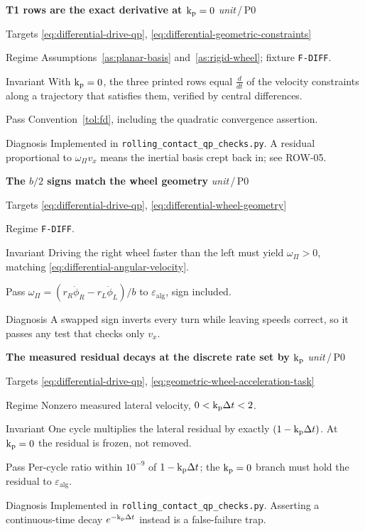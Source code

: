\documentclass[10pt]{article}
\newcommand{\wheelAngle}{\phi}
\newcommand{\wheelRadius}{r}
\newcommand{\testTol}{\varepsilon}
\newcommand{\harness}{\texttt{rolling\_contact\_qp\_checks.py}\xspace}
\newenvironment{testcard}[4]{%
  \par\medskip\noindent
  \tBlock{#1}\quad\textbf{#2}%
  \hfill{\small\textit{#3}\,/\,#4}\par\nopagebreak\vspace{2pt}
  \begin{description}[leftmargin=7.5em,style=sameline,itemsep=1pt,topsep=1pt]
}{%
  \end{description}\par\medskip
}
\begin{document}
\begin{testcard}{ROW-01}{T1 rows are the exact derivative at $\text{k}_{\text{p}}=0$}{unit}{P0}
  \item[Targets] \eqref{eq:differential-drive-qp},
    \eqref{eq:differential-geometric-constraints}
  \item[Regime] Assumptions~\ref{as:planar-basis} and~\ref{as:rigid-wheel};
    fixture \texttt{F-DIFF}.
  \item[Invariant] With $\text{k}_{\text{p}}=0$, the three printed rows equal
    $\frac{d}{dt}$ of the velocity constraints along a trajectory that
    satisfies them, verified by central differences.
  \item[Pass] Convention~\ref{tol:fd}, including the quadratic convergence
    assertion.
  \item[Diagnosis] Implemented in \harness. A residual proportional to
    $\omega_{\Pi}v_x$ means the inertial basis crept back in; see ROW-05.
\end{testcard}

\begin{testcard}{ROW-02}{The $b/2$ signs match the wheel geometry}{unit}{P0}
  \item[Targets] \eqref{eq:differential-drive-qp},
    \eqref{eq:differential-wheel-geometry}
  \item[Regime] \texttt{F-DIFF}.
  \item[Invariant] Driving the right wheel faster than the left must yield
    $\omega_{\Pi}>0$, matching
    \eqref{eq:differential-angular-velocity}.
  \item[Pass] $\omega_{\Pi}=(\wheelRadius_R\dot{\wheelAngle}_R
    -\wheelRadius_L\dot{\wheelAngle}_L)/b$ to $\testTol_{\text{alg}}$, sign
    included.
  \item[Diagnosis] A swapped sign inverts every turn while leaving speeds
    correct, so it passes any test that checks only $v_x$.
\end{testcard}

\begin{testcard}{ROW-03}{The measured residual decays at the discrete rate set by $\text{k}_{\text{p}}$}{unit}{P0}
  \item[Targets] \eqref{eq:differential-drive-qp},
    \eqref{eq:geometric-wheel-acceleration-task}
  \item[Regime] Nonzero measured lateral velocity, $0<\text{k}_{\text{p}}\Delta t<2$.
  \item[Invariant] One cycle multiplies the lateral residual by exactly
    $(1-\text{k}_{\text{p}}\Delta t)$. At $\text{k}_{\text{p}}=0$ the residual is frozen, not
    removed.
  \item[Pass] Per-cycle ratio within $10^{-9}$ of $1-\text{k}_{\text{p}}\Delta t$;
    the $\text{k}_{\text{p}}=0$ branch must hold the residual to $\testTol_{\text{alg}}$.
  \item[Diagnosis] Implemented in \harness. Asserting a continuous-time decay
    $e^{-\text{k}_{\text{p}}\Delta t}$ instead is a false-failure trap.
\end{testcard}
\end{document}
